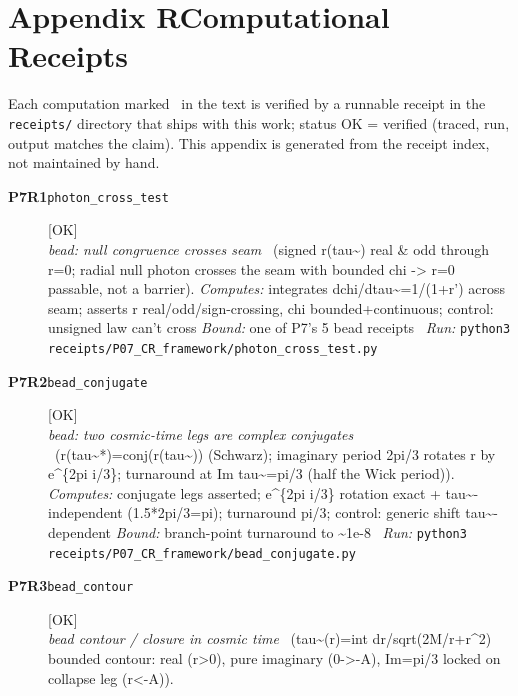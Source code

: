 \clearpage
\section*{Appendix R\quad Computational Receipts}\label{app:receipts}
\small\noindent Each computation marked \rcptmarker\ in the text is verified by a runnable receipt in the \texttt{receipts/} directory that ships with this work; status \textsf{OK} = verified (traced, run, output matches the claim). This appendix is generated from the receipt index, not maintained by hand.\par\medskip
\begingroup\renewcommand{\arraystretch}{1.25}
\begin{description}
\item[\textbf{P7R1}\quad\texttt{photon\_cross\_test}]\hfill\textsf{[OK]}\\
\textit{bead: null congruence crosses seam} \ (signed r(tau\textasciitilde{}) real \& odd through r=0; radial null photon crosses the seam with bounded chi -> r=0 passable, not a barrier). 
\emph{Computes:} integrates dchi/dtau\textasciitilde{}=1/(1+r') across seam; asserts r real/odd/sign-crossing, chi bounded+continuous; control: unsigned law can't cross
 \emph{Bound:} one of P7's 5 bead receipts
\ \emph{Run:} \texttt{python3 receipts/P07\_CR\_framework/photon\_cross\_test.py}
\item[\textbf{P7R2}\quad\texttt{bead\_conjugate}]\hfill\textsf{[OK]}\\
\textit{bead: two cosmic-time legs are complex conjugates} \ (r(tau\textasciitilde{}*)=conj(r(tau\textasciitilde{})) (Schwarz); imaginary period 2pi/3 rotates r by e\textasciicircum{}\{2pi i/3\}; turnaround at Im tau\textasciitilde{}=pi/3 (half the Wick period)). 
\emph{Computes:} conjugate legs asserted; e\textasciicircum{}\{2pi i/3\} rotation exact + tau\textasciitilde{}-independent (1.5*2pi/3=pi); turnaround pi/3; control: generic shift tau\textasciitilde{}-dependent
 \emph{Bound:} branch-point turnaround to \textasciitilde{}1e-8
\ \emph{Run:} \texttt{python3 receipts/P07\_CR\_framework/bead\_conjugate.py}
\item[\textbf{P7R3}\quad\texttt{bead\_contour}]\hfill\textsf{[OK]}\\
\textit{bead contour / closure in cosmic time} \ (tau\textasciitilde{}(r)=int dr/sqrt(2M/r+r\textasciicircum{}2) bounded contour: real (r>0), pure imaginary (0->-A), \textbar{}Im\textbar{}=pi/3 locked on collapse leg (r<-A)). 

\end{description}
